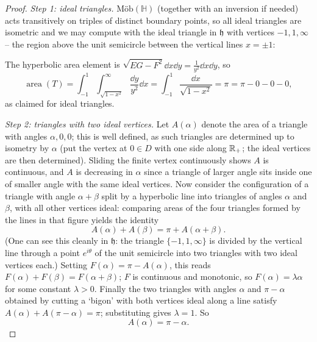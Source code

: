 \documentclass[a4paper]{scrartcl}
\newcommand{\Mob}{\text{M\"ob}}
\newcommand{\HH}{\mathbb{H}}
\begin{document}
\begin{proof}
    \emph{Step 1: ideal triangles.} $\Mob(\HH)$ (together with an inversion if needed) acts transitively on triples of distinct boundary points, so all ideal triangles are isometric and we may compute with the ideal triangle in $\mathfrak{h}$ with vertices $-1, 1, \infty$ -- the region above the unit semicircle between the vertical lines $x = \pm 1$:
    \begin{center}
    \end{center}
    The hyperbolic area element is $\sqrt{EG - F^2} \dd x \dd y = \frac{1}{y^2} \dd x \dd y$, so
    $$
    \operatorname{area}(T) = \int_{-1}^1 \int_{\sqrt{1 - x^2}}^{\infty} \frac{\dd y}{y^2} \dd x = \int_{-1}^1 \frac{\dd x}{\sqrt{1 - x^2}} = \pi = \pi - 0 - 0 - 0,
    $$
    as claimed for ideal triangles.

    \emph{Step 2: triangles with two ideal vertices.} Let $A(\alpha)$ denote the area of a triangle with angles $\alpha, 0, 0$; this is well defined, as such triangles are determined up to isometry by $\alpha$ (put the vertex at $0 \in D$ with one side along $\mathbb{R}_+$; the ideal vertices are then determined). Sliding the finite vertex continuously shows $A$ is continuous, and $A$ is decreasing in $\alpha$ since a triangle of larger angle sits inside one of smaller angle with the same ideal vertices. Now consider the configuration of a triangle with angle $\alpha + \beta$ split by a hyperbolic line into triangles of angles $\alpha$ and $\beta$, with all other vertices ideal: comparing areas of the four triangles formed by the lines in that figure yields the identity
    $$
    A(\alpha) + A(\beta) = \pi + A(\alpha + \beta).
    $$
    (One can see this cleanly in $\mathfrak{h}$: the triangle $\{-1, 1, \infty\}$ is divided by the vertical line through a point $e^{i\theta}$ of the unit semicircle into two triangles with two ideal vertices each.) Setting $F(\alpha) = \pi - A(\alpha)$, this reads $F(\alpha) + F(\beta) = F(\alpha + \beta)$; $F$ is continuous and monotonic, so $F(\alpha) = \lambda \alpha$ for some constant $\lambda > 0$. Finally the two triangles with angles $\alpha$ and $\pi - \alpha$ obtained by cutting a `bigon' with both vertices ideal along a line satisfy $A(\alpha) + A(\pi - \alpha) = \pi$; substituting gives $\lambda = 1$. So
    $$
    A(\alpha) = \pi - \alpha.
    $$


\end{proof}
\end{document}
